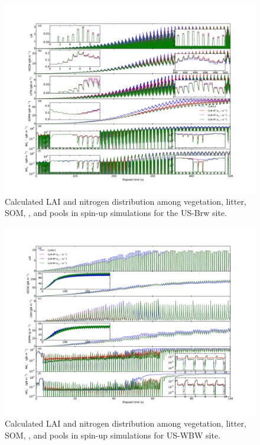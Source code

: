\documentclass[gmdd, online, hvmath]{copernicus}
\begin{document}
\begin{figure}
\includegraphics[width=120mm]{gmd-2015-254-discussions-f04.pdf}
\caption{Calculated LAI and nitrogen distribution among vegetation, litter, SOM, , and  pools in spin-up simulations for the US-Brw site.}
\label{fig:brw500yl}
\end{figure}

\begin{figure}
\includegraphics[width=120mm]{gmd-2015-254-discussions-f05.pdf}
\caption{Calculated LAI and nitrogen distribution among vegetation, litter, SOM, , and  pools in spin-up simulations for US-WBW site.}
\label{fig:pit300yl}
\end{figure}
\end{document}
